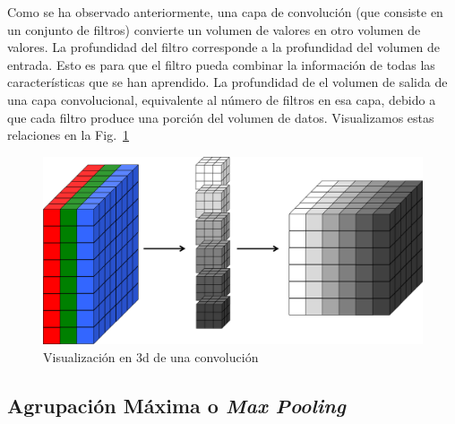 	Como se ha observado anteriormente, una capa de convolución (que consiste en un conjunto de filtros) convierte un volumen de valores en otro volumen de valores. La profundidad del filtro corresponde a la profundidad del volumen de entrada. Esto es para que el filtro pueda combinar la información de todas las características que se han aprendido. La profundidad de el volumen de salida de una capa convolucional, equivalente al número de filtros en esa capa, debido a que cada filtro produce una porción del volumen de datos. Visualizamos estas relaciones en la Fig.~\ref{fig:conv_depth}
	\begin{figure}[htp]
        \centering
        \includegraphics[scale=0.3]{chapter3/conv_depth.png}
        \caption{Visualización en 3d de una convolución}
        \label{fig:conv_depth}
    \end{figure}


    \subsection{Agrupación Máxima o \textit{Max Pooling}}

